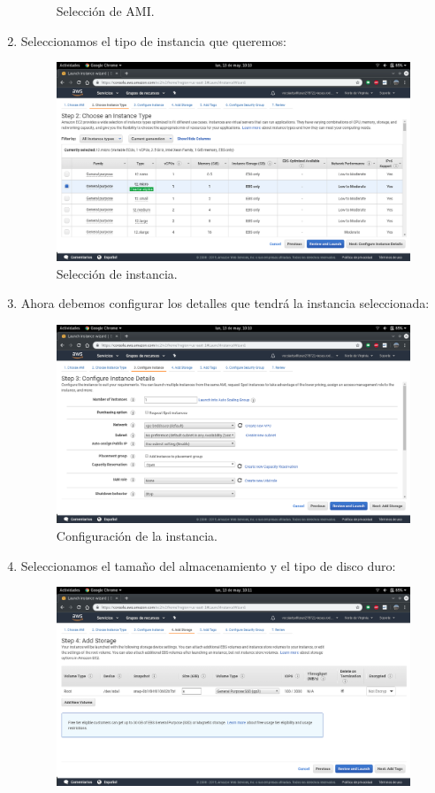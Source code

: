 \begin{enumerate}
\begin{figure}[h]
		\caption{Selección de AMI.}
		\label{Selección de AMI}
	\end{figure}
	\item Seleccionamos el tipo de instancia que queremos:
	\begin{figure}[h]
		\centering
		\includegraphics[scale=0.28]{ImagenesAWS/6.png}
		\caption{Selección de instancia.}
		\label{Selección de instancia}
	\end{figure}
\newpage
	\item Ahora debemos configurar los detalles que tendrá la instancia seleccionada:
	\begin{figure}[h]
		\centering
		\includegraphics[scale=0.28]{ImagenesAWS/7.png}
		\caption{Configuración de la instancia.}
		\label{Configuración de la instancia}
	\end{figure}
	\item Seleccionamos el tamaño del almacenamiento y el tipo de disco duro:
	\begin{figure}[h]
		\centering
		\includegraphics[scale=0.28]{ImagenesAWS/8.png}

\end{figure}
\end{enumerate}
